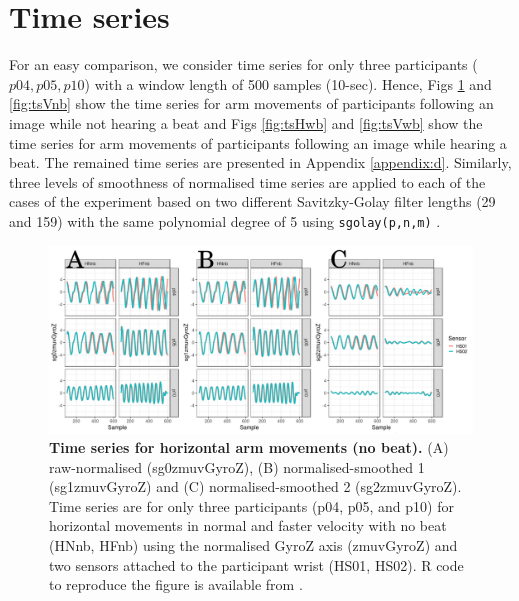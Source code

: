 \section{Time series}
For an easy comparison, we consider time series for only three 
participants ($p04, p05, p10$) with a window length of 500 samples (10-sec).
Hence, Figs \ref{fig:tsHnb} and \ref{fig:tsVnb} show the 
time series for arm movements of participants following an image 
while not hearing a beat and Figs \ref{fig:tsHwb} and \ref{fig:tsVwb} 
show the time series for arm movements of participants following an image 
while hearing a beat.
The remained time series are presented in Appendix \ref{appendix:d}.
Similarly, three levels of smoothness of normalised time series are applied 
to each of the cases of the experiment based on two different 
Savitzky-Golay filter lengths (29 and 159) with the same polynomial 
degree of 5 using \texttt{sgolay(p,n,m)} \citep{Rsignal}.
\begin{figure}[!h]
\centering
\includegraphics[width=1.0\textwidth]{tsHnb}
    	\caption{ 
	{\bf Time series for horizontal arm movements (no beat).}
		(A) raw-normalised (sg0zmuvGyroZ), 
		(B) normalised-smoothed 1 (sg1zmuvGyroZ) and
		(C) normalised-smoothed 2 (sg2zmuvGyroZ).
		Time series are for only three participants (p04, p05, and p10) 
		for horizontal movements in normal and faster velocity with
		no beat	(HNnb, HFnb) using the normalised 
		GyroZ axis (zmuvGyroZ) and two sensors attached to 
		the participant wrist (HS01, HS02).
	R code to reproduce the figure is available from \cite{hwum2018}.
        }
    \label{fig:tsHnb}
\end{figure}
